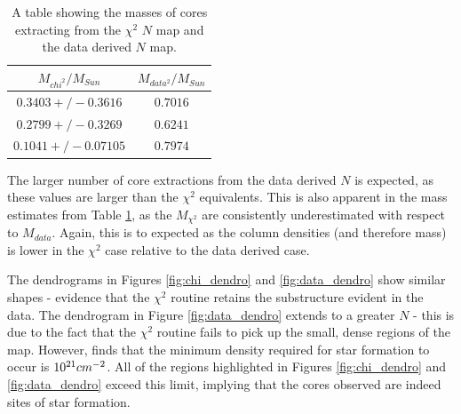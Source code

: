 \documentclass{report}
\begin{document}
\begin{table}[h]
  \centering
   \begin{tabular}{||c c||}
   \hline
   $M_{chi^{2}}/M_{Sun}$ & $M_{data^{2}}/M_{Sun}$ \\ [0.5ex]
   \hline\hline
   $0.3403+/-0.3616$    & $0.7016$     \\
   \hline
   $0.2799+/-0.3269$  & $0.6241$ \\
   \hline
   $0.1041+/-0.07105$  & $0.7974$ \\
   \end{tabular}
   \caption{A table showing the masses of cores extracting from the $\chi^{2}$ $N$ map and the data derived $N$ map.}
   \label{table:mass}
\end{table}

The larger number of core extractions from the data derived $N$ is expected, as these values are larger than the $\chi^{2}$ equivalents. This is also apparent in the mass estimates from Table \ref{table:mass}, as the $M_{\chi^{2}}$ are consistently underestimated with respect to $M_{data}$. Again, this is to expected as the column densities (and therefore mass) is lower in the $\chi^{2}$ case relative to the data derived case.

The dendrograms in Figures \ref{fig:chi_dendro} and \ref{fig:data_dendro} show similar shapes - evidence that the $\chi^{2}$ routine retains the substructure evident in the data. The dendrogram in Figure
\ref{fig:data_dendro} extends to a greater $N$ - this is due to the fact that the $\chi^{2}$ routine fails to pick up the small, dense regions of the map. However, \textcite{coldensity} finds that the minimum density required for star formation to occur is $10^{21}\/cm^{-2}$. All of the regions highlighted in Figures \ref{fig:chi_dendro} and \ref{fig:data_dendro} exceed this limit, implying that the cores observed are indeed sites of star formation.

\end{document}
